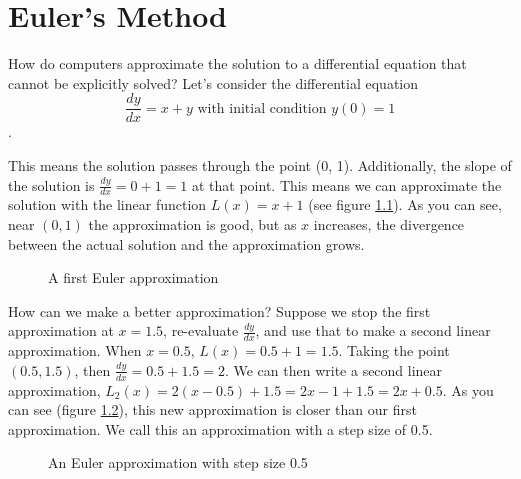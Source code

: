 \chapter{Euler's Method}

How do computers approximate the solution to a differential equation that 
cannot be explicitly solved? Let's consider the differential equation 
$$\frac{dy}{dx} = x + y \text{ with initial condition } y(0) = 1$$.

This means the solution passes through the point (0, 1). Additionally, the 
slope of the solution is $\frac{dy}{dx} = 0 + 1 = 1$ at that point. This means 
we can approximate the solution with the linear function $L(x) = x + 1$ (see 
figure \ref{fig:euler1}). As you can see, near $(0,1)$ the approximation is 
good, but as $x$ increases, the divergence between the actual solution and the 
approximation grows. 

\begin{figure}[htbp]
\centering
{}
\caption{A first Euler approximation}
\label{fig:euler1}
\end{figure}

How can we make a better approximation? Suppose we stop the first 
approximation at $x = 1.5$, re-evaluate $\frac{dy}{dx}$, and use that to make 
a second linear approximation. When $x = 0.5$, $L(x) = 0.5 + 1 = 1.5$. Taking 
the point $(0.5, 1.5)$, then $\frac{dy}{dx} = 0.5 + 1.5 = 2$. We can then 
write a second linear approximation, $L_2(x) = 2(x - 0.5) + 1.5 = 2x - 1 + 1.5 
= 2x + 0.5$. As you can see (figure \ref{fig:euler2}), this new approximation 
is closer than our first approximation. We call this an approximation with a 
step size of 0.5.

\begin{figure}[htbp]
\centering
{}
\caption{An Euler approximation with step size 0.5}
\label{fig:euler2}
\end{figure}

